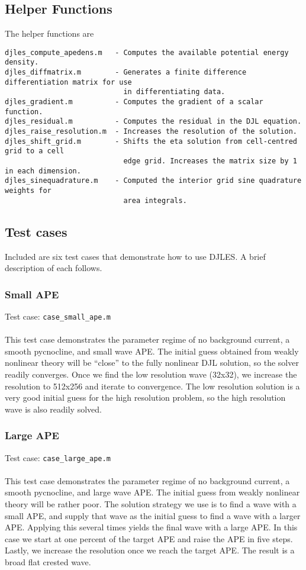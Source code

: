 \documentclass[letterpaper]{article}
\begin{document}
\subsection{Helper Functions}
The helper functions are
\begin{verbatim}
djles_compute_apedens.m   - Computes the available potential energy density.
djles_diffmatrix.m        - Generates a finite difference differentiation matrix for use
                            in differentiating data.
djles_gradient.m          - Computes the gradient of a scalar function.
djles_residual.m          - Computes the residual in the DJL equation.
djles_raise_resolution.m  - Increases the resolution of the solution.
djles_shift_grid.m        - Shifts the eta solution from cell-centred grid to a cell
                            edge grid. Increases the matrix size by 1 in each dimension.
djles_sinequadrature.m    - Computed the interior grid sine quadrature weights for
                            area integrals.
\end{verbatim}

\subsection{Test cases}
Included are six test cases that demonstrate how to use DJLES. A brief description of each follows.

\subsubsection{Small APE}
Test case: \verb"case_small_ape.m" \\\\
This test case demonstrates the parameter regime of no background current, a smooth pycnocline, and small wave APE.
The initial guess obtained from weakly nonlinear theory will be ``close'' to the fully nonlinear DJL solution, so the solver readily converges.
Once we find the low resolution wave (32x32), we increase the resolution to 512x256 and iterate to convergence.
The low resolution solution is a very good initial guess for the high resolution problem, so the high resolution wave is also readily solved.

\subsubsection{Large APE}
Test case: \verb"case_large_ape.m" \\\\
This test case demonstrates the parameter regime of no background current, a smooth pycnocline, and large wave APE.
The initial guess from weakly nonlinear theory will be rather poor. 
The solution strategy we use is to find a wave with a small APE, and supply that wave as the initial guess to find a wave with a larger APE.
Applying this several times yields the final wave with a large APE.
In this case we start at one percent of the target APE and raise the APE in five steps.
Lastly, we increase the resolution once we reach the target APE.
The result is a broad flat crested wave.
\end{document}
